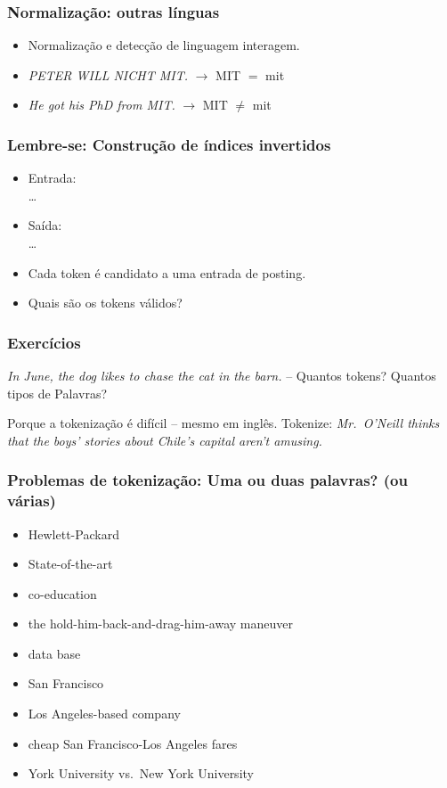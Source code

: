 \documentclass[compress]{beamer}
\begin{document}
\begin{frame}
\frametitle{Normalização: outras línguas}
\begin{itemize}[<+->]
\item Normalização e detecção de linguagem interagem.
\item \emph{PETER WILL NICHT MIT.} $\rightarrow$ MIT
  $=$ mit
\item \emph{He got his PhD from MIT.} $\rightarrow$ MIT
  $\neq$ mit
\end{itemize}
\end{frame}

\begin{frame}
\frametitle{Lembre-se: Construção de índices invertidos}
\begin{itemize}[<+->]
\item Entrada:\\[0.2ex]
 \ldots
\item Saída:\\[0.2ex]
 
    \ldots
\item Cada token é candidato a uma entrada de posting.
\item Quais são os tokens válidos?
\end{itemize}
\end{frame}

\begin{frame}
\frametitle{Exercícios}

\emph{In June, the dog likes to chase the cat in the barn.} --
{\color{green}Quantos tokens? Quantos tipos de Palavras?}

\bigskip

Porque a tokenização é difícil -- mesmo em inglês. {\color{green}Tokenize:}
 \emph{Mr.\ O'Neill
thinks that the boys' stories about Chile's capital aren't amusing.}
\end{frame}

\begin{frame}
\frametitle{Problemas de tokenização: Uma ou duas palavras? (ou várias)}
\begin{itemize}[<+->]
\item Hewlett-Packard
\item State-of-the-art
\item co-education
\item the hold-him-back-and-drag-him-away maneuver
\item data base
\item San Francisco
\item Los Angeles-based company
\item cheap San Francisco-Los Angeles fares
\item York University vs.\ New York University
\end{itemize}
\end{frame}
\end{document}
